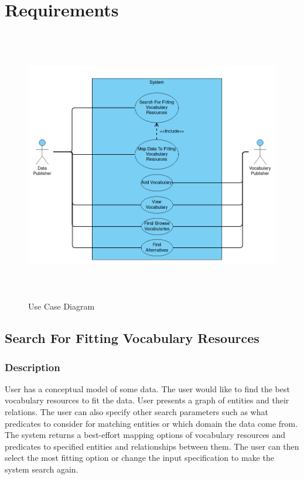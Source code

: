 \chapter{Requirements}
\begin{figure}[h!]\centering
\includegraphics[width=120mm, height=120mm]{../img/use-case-diagram.png}
\caption{Use Case Diagram}
\label{fig:use-case}
\end{figure}                            
\section{Search For Fitting Vocabulary Resources}
\label{sec:fit-vocab-res}

\subsection{Description}
User has a conceptual model of some data. The user would like to find the best vocabulary resources to fit the data. User presents a graph of entities and their relations. The user can also specify other search parameters such as what predicates to consider for matching entities or which domain the data come from. The system returns a best-effort mapping options of vocabulary resources and predicates to specified entities and relationships between them. The user can then select the most fitting option or change the input specification to make the system search again. 

